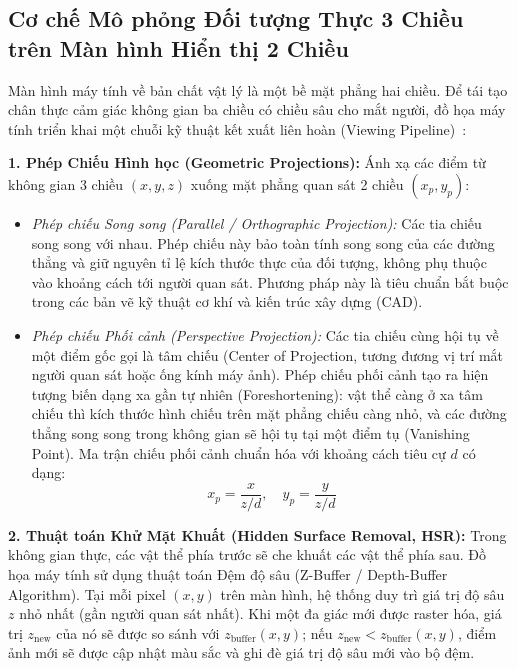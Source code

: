 \subsection{Cơ chế Mô phỏng Đối tượng Thực 3 Chiều trên Màn hình Hiển thị 2 Chiều}
\label{subsec:w4_display}

Màn hình máy tính về bản chất vật lý là một bề mặt phẳng hai chiều. Để tái tạo chân thực cảm giác không gian ba chiều có chiều sâu cho mắt người, đồ họa máy tính triển khai một chuỗi kỹ thuật kết xuất liên hoàn (Viewing Pipeline)~\citep{hearn2004computer}:

\textbf{1. Phép Chiếu Hình học (Geometric Projections):}
Ánh xạ các điểm từ không gian 3 chiều $(x, y, z)$ xuống mặt phẳng quan sát 2 chiều $(x_p, y_p)$:
\begin{itemize}
    \item \textit{Phép chiếu Song song (Parallel / Orthographic Projection):} Các tia chiếu song song với nhau. Phép chiếu này bảo toàn tính song song của các đường thẳng và giữ nguyên tỉ lệ kích thước thực của đối tượng, không phụ thuộc vào khoảng cách tới người quan sát. Phương pháp này là tiêu chuẩn bắt buộc trong các bản vẽ kỹ thuật cơ khí và kiến trúc xây dựng (CAD).
    \item \textit{Phép chiếu Phối cảnh (Perspective Projection):} Các tia chiếu cùng hội tụ về một điểm gốc gọi là tâm chiếu (Center of Projection, tương đương vị trí mắt người quan sát hoặc ống kính máy ảnh). Phép chiếu phối cảnh tạo ra hiện tượng biến dạng xa gần tự nhiên (Foreshortening): vật thể càng ở xa tâm chiếu thì kích thước hình chiếu trên mặt phẳng chiếu càng nhỏ, và các đường thẳng song song trong không gian sẽ hội tụ tại một điểm tụ (Vanishing Point). Ma trận chiếu phối cảnh chuẩn hóa với khoảng cách tiêu cự $d$ có dạng:
    \begin{equation}
    x_p = \frac{x}{z / d}, \quad y_p = \frac{y}{z / d}
    \end{equation}
\end{itemize}

\textbf{2. Thuật toán Khử Mặt Khuất (Hidden Surface Removal, HSR):}
Trong không gian thực, các vật thể phía trước sẽ che khuất các vật thể phía sau. Đồ họa máy tính sử dụng thuật toán Đệm độ sâu (Z-Buffer / Depth-Buffer Algorithm). Tại mỗi pixel $(x, y)$ trên màn hình, hệ thống duy trì giá trị độ sâu $z$ nhỏ nhất (gần người quan sát nhất). Khi một đa giác mới được raster hóa, giá trị $z_{\text{new}}$ của nó sẽ được so sánh với $z_{\text{buffer}}(x, y)$; nếu $z_{\text{new}} < z_{\text{buffer}}(x, y)$, điểm ảnh mới sẽ được cập nhật màu sắc và ghi đè giá trị độ sâu mới vào bộ đệm.

